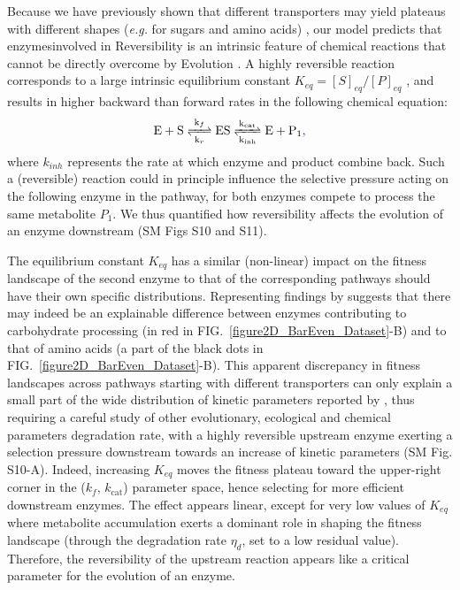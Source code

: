 \documentclass[11pt,onecolumn]{article}
\providecommand{\DIFadd}[1]{{\protect\color{blue} \sf #1}} %
\providecommand{\DIFdel}[1]{{\protect\color{red} \scriptsize #1}} %
\providecommand{\DIFaddbegin}{} %
\providecommand{\DIFaddend}{} %
\providecommand{\DIFdelbegin}{} %
\providecommand{\DIFdelend}{} %
\begin{document}
\DIFdelbegin \DIFdel{Because we have previously shown that different transporters may yield plateaus with different shapes (\textit{e.g.} for sugars and amino acids) , our model predicts that enzymesinvolved in }\DIFdelend \DIFaddbegin \DIFadd{Reversibility is an intrinsic feature of chemical reactions that cannot be directly overcome by Evolution \citep{Haldane30,Cornish-Bowden79a}. A highly reversible reaction corresponds to a large intrinsic equilibrium constant $K_{eq}=[S]_{eq}/[P]_{eq}$ \citep{Klipp94}, and results in higher backward than forward rates in the following chemical equation: }\begin{equation}
\ce{ E + S <=>[k_{f}][k_{r}] ES <=>[k_{cat}][k_{inh}] E + P_1 }\DIFadd{,
\label{chemMM_fullrev}
}\end{equation}
\DIFadd{where $k_{inh}$ represents the rate at which enzyme and product combine back. Such a (reversible) reaction could in principle influence the selective pressure acting on the following enzyme in the pathway, for both enzymes compete to process the same metabolite $P_1$. We thus quantified how reversibility affects the evolution of an enzyme downstream (SM Figs S10 and S11). 
}

\DIFadd{The equilibrium constant $K_{eq}$ has a similar (non-linear) impact on the fitness landscape of the second enzyme to that of }\DIFaddend the \DIFdelbegin \DIFdel{corresponding pathways should have their own specific distributions. Representing findings by  \citep{Bar-Even11} suggests that there may indeed be an explainable difference between enzymes contributing to carbohydrate processing (in red in FIG.~\ref{figure2D_BarEven_Dataset}-B) and to that of amino acids (a part of the black dots in FIG.~\ref{figure2D_BarEven_Dataset}-B). %
This apparent discrepancy in fitness landscapes across pathways starting with different transporters can only explain a small part of the wide distribution of kinetic parameters reported by \citet{Bar-Even11}, thus requiring a careful study of other evolutionary, ecological and chemical parameters}\DIFdelend \DIFaddbegin \DIFadd{degradation rate, with a highly reversible upstream enzyme exerting a selection pressure downstream towards an increase of kinetic parameters (SM Fig. S10-A). Indeed, increasing $K_{eq}$ moves the fitness plateau toward the upper-right corner in the ($k_f$, $k_\text{cat}$) parameter space, hence selecting for more efficient downstream enzymes. The effect appears linear, except for very low values of $K_{eq}$ where metabolite accumulation exerts a dominant role in shaping the fitness landscape (through the degradation rate $\eta_d$, set to a low residual value). Therefore, the reversibility of the upstream reaction appears like a critical parameter for the evolution of an enzyme}\DIFaddend . 
\end{document}
